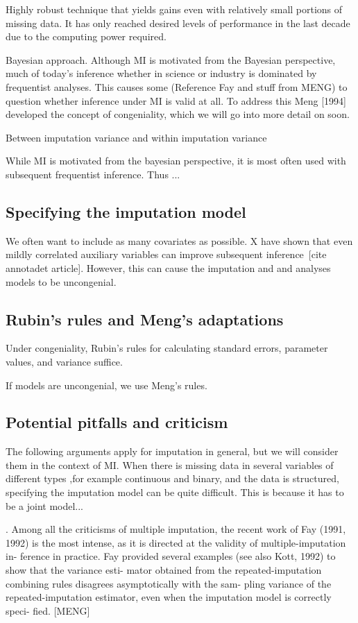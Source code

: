 \documentclass{article}
\begin{document}
	Highly robust technique that yields gains even with relatively small portions of missing data. It has only reached desired levels of performance in the last decade due to the computing power required. 
	
	Bayesian approach. Although MI is motivated from the Bayesian perspective, much of today's inference whether in science or industry is dominated by frequentist analyses. This causes some (Reference Fay and stuff from MENG) to question whether inference under MI is valid at all. To address this Meng [1994] developed the concept of congeniality, which we will go into more detail on soon.
	
	Between imputation variance and within imputation variance
	
	
	While MI is motivated from the bayesian perspective, it is most often used with subsequent frequentist inference. Thus ...
	
	\subsection{Specifying the imputation model}
	
	
	We often want to include as many covariates as possible. X have shown that even mildly correlated auxiliary variables can improve subsequent inference [cite annotadet article]. However, this can cause the imputation and and analyses models to be uncongenial.
	
	\subsection{Rubin's rules and Meng's adaptations}
	
	Under congeniality, Rubin's rules for calculating standard errors, parameter values, and variance suffice.
	
	If models are uncongenial, we use Meng's rules.
	
	\subsection{Potential pitfalls and criticism}
	The following arguments apply for imputation in general, but we will consider them in the context of MI. When there is missing data in several variables of different types ,for example continuous and binary, and the data is structured, specifying the imputation model can be quite difficult. This is because it has to be a joint model...
	
	
	. Among all the
	criticisms of multiple imputation, the recent work
	of Fay (1991, 1992) is the most intense, as it is
	directed at the validity of multiple-imputation in-
	ference in practice. Fay provided several examples
	(see also Kott, 1992) to show that the variance esti-
	mator obtained from the repeated-imputation combining rules disagrees asymptotically with the sam-
	pling variance of the repeated-imputation estimator,
	even when the imputation model is correctly speci-
	fied. [MENG]
	
\end{document}
